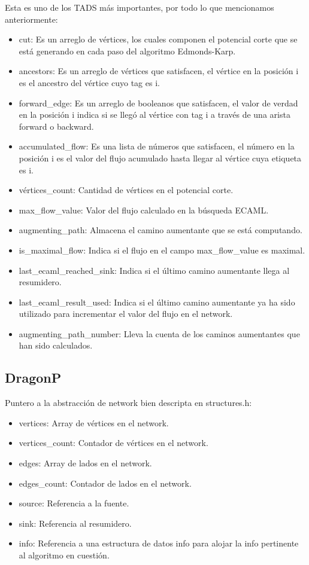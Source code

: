 \documentclass[11pt]{article}
\begin{document}
Esta es uno de los TADS más importantes, por todo lo que mencionamos anteriormente:
\begin{itemize}
\item cut: Es un arreglo de vértices, los cuales componen el potencial
  corte que se está generando en cada paso del algoritmo Edmonds-Karp.
\item ancestors: Es un arreglo de vértices que satisfacen, el vértice en
  la posición i es el ancestro del vértice cuyo tag es i.
\item forward\_edge: Es un arreglo de booleanos que satisfacen, el valor
  de verdad en la posición i indica si se llegó al vértice con tag i a
  través de una arista forward o backward.
\item accumulated\_flow: Es una lista de números que satisfacen, el número
  en la posición i es el valor del flujo acumulado hasta llegar al
  vértice cuya etiqueta es i.
\item vértices\_count: Cantidad de vértices en el potencial corte.
\item max\_flow\_value: Valor del flujo calculado en la búsqueda ECAML.
\item augmenting\_path: Almacena el camino aumentante que se está computando.
\item is\_maximal\_flow: Indica si el flujo en el campo max\_flow\_value es maximal.
\item last\_ecaml\_reached\_sink: Indica si el último camino aumentante llega al resumidero.
\item last\_ecaml\_result\_used: Indica si el último camino aumentante ya
  ha sido utilizado para incrementar el valor del flujo en el network.
\item augmenting\_path\_number: Lleva la cuenta de los caminos aumentantes
  que han sido calculados.
\end{itemize}
\subsection{DragonP}
\label{sec-5-6}

Puntero a la abstracción de network bien descripta en structures.h:
\begin{itemize}
\item vertices: Array de vértices en el network.
\item vertices\_count: Contador de vértices en el network.
\item edges: Array de lados en el network.
\item edges\_count: Contador de lados en el network.
\item source: Referencia a la fuente.
\item sink: Referencia al resumidero.
\item info: Referencia a una estructura de datos info para alojar la info
  pertinente al algoritmo en cuestión.
\end{itemize}
\end{document}
